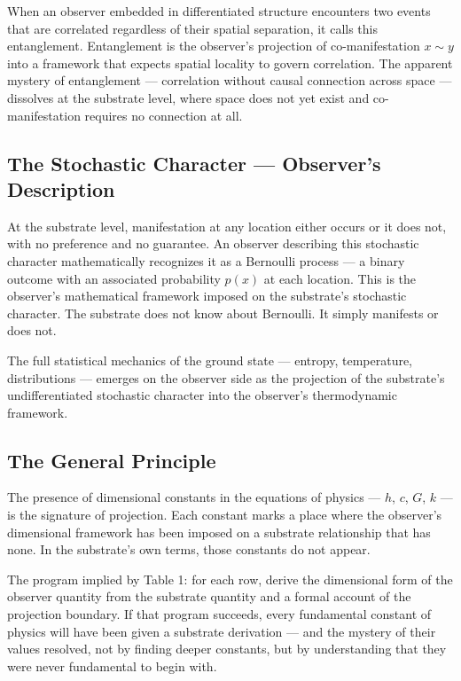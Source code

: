 \documentclass[11pt,letterpaper]{article}
\begin{document}
When an observer embedded in differentiated structure encounters two events that are correlated regardless of their spatial separation, it calls this entanglement. Entanglement is the observer's projection of co-manifestation \(x \sim y\) into a framework that expects spatial locality to govern correlation. The apparent mystery of entanglement --- correlation without causal connection across space --- dissolves at the substrate level, where space does not yet exist and co-manifestation requires no connection at all.
\subsection{The Stochastic Character --- Observer's Description}
\label{sec:orga0b31d3}

At the substrate level, manifestation at any location either occurs or it does not, with no preference and no guarantee. An observer describing this stochastic character mathematically recognizes it as a Bernoulli process --- a binary outcome with an associated probability \(p(x)\) at each location. This is the observer's mathematical framework imposed on the substrate's stochastic character. The substrate does not know about Bernoulli. It simply manifests or does not.

The full statistical mechanics of the ground state --- entropy, temperature, distributions --- emerges on the observer side as the projection of the substrate's undifferentiated stochastic character into the observer's thermodynamic framework.
\subsection{The General Principle}
\label{sec:org38cef64}

The presence of dimensional constants in the equations of physics --- \(h\), \(c\), \(G\), \(k\) --- is the signature of projection. Each constant marks a place where the observer's dimensional framework has been imposed on a substrate relationship that has none. In the substrate's own terms, those constants do not appear.

The program implied by Table 1: for each row, derive the dimensional form of the observer quantity from the substrate quantity and a formal account of the projection boundary. If that program succeeds, every fundamental constant of physics will have been given a substrate derivation --- and the mystery of their values resolved, not by finding deeper constants, but by understanding that they were never fundamental to begin with.
\end{document}
